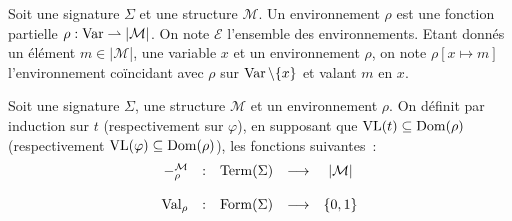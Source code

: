 \begin{definition}[Environnement]
  Soit une signature $\Sigma$ et une structure $\mathcal M$. Un environnement
  $\rho$ est une fonction partielle $\rho : \operatorname{Var}\rightharpoonup |\mathcal M|$. On
  note $\mathcal E$ l'ensemble des environnements. Etant donnés un élément
  $m\in|\mathcal M$|, une variable $x$ et un environnement $\rho$, on note
  $\rho[x \mapsto m]$ l'environnement coïncidant avec $\rho$ sur
  $\operatorname{Var}\backslash\{x\}$ et valant $m$ en $x$.
\end{definition}

\begin{definition}
  Soit une signature $\Sigma$, une structure $\mathcal M$ et un environnement
  $\rho$. On définit par induction sur $t$ (respectivement sur $\varphi$), en
  supposant que $\operatorname{VL}(t)\subseteq\operatorname{Dom}(\rho)$ (respectivement
  $\operatorname{VL}(\varphi)\subseteq\operatorname{Dom}(\rho)$), les fonctions suivantes~:
  \[\begin{array}{rcccc}
  -_\rho^\mathcal M & : & \operatorname{Term}(\Sigma) & \longrightarrow & |\mathcal M|\\
  \\
  \operatorname{Val}_\rho & : & \operatorname{Form}(\Sigma) & \longrightarrow & \{0,1\}\\
  \end{array}\]


\end{definition}
